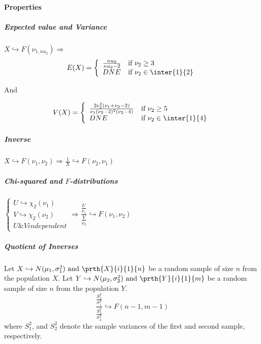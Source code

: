 \paragraph{Properties}
\subparagraph{Expected value and Variance}
$X\hookrightarrow F(\nu_{{1},nu_{2}})\Rightarrow$
$$
E(X) = 
\left\{
\begin{array}{ll}
	\frac{nu_{2}}{nu_{2}-2} & \mbox{if }\nu_{2}\geq 3 \\
	DNE &\mbox{if }\nu_{2}\in\inter{1}{2}
\end{array}
\right.
$$
\begin{center}
	And
\end{center}
$$
V(X) = 
\left\{
\begin{array}{ll}
	\frac{2\nu_{2}^{2}(\nu_{1}+\nu_{2}-2)}{\nu_{1}(\nu_{2}-2)^{2}(\nu_{2}-4)} & \mbox{if }\nu_{2}\geq 5 \\
	DNE &\mbox{if }\nu_{2}\in\inter{1}{4}
\end{array}
\right.
$$
\subparagraph{Inverse}
$X\hookrightarrow F(\nu_{1},\nu_{2})\Rightarrow \frac{1}{X}\hookrightarrow F(\nu_{2},\nu_{1})$\\
\subparagraph{Chi-squared and $F$-distributions}
$
\begin{cases}
	U\hookrightarrow\chi_{2}(\nu_{1})\\
	V\hookrightarrow\chi_{2}(\nu_{2})\\
	U\& V independent
\end{cases}
\Rightarrow
\dfrac{\frac{U}{\nu_{1}}}{\frac{V}{\nu_{2}}}\hookrightarrow F(\nu_{1},\nu_{2})
$
\subparagraph{Quotient of Inverses}
Let $X\hookrightarrow N(\mu_{1},\sigma_{1}^{2})\text{ and }\prth{X}{i}{1}{n}$ be a random sample of size $n$ from the population $X$.
Let $Y\hookrightarrow N(\mu_{2},\sigma_{2}^{2})\text{ and }\prth{Y}{i}{1}{m}$ be a random sample of size $n$ from the population $Y$.
$$
\dfrac{\frac{S_{1}^{2}}{\sigma_{1}^{2}}}{\frac{S_{2}^{2}}{\sigma_{2}^{2}}} \hookrightarrow F(n-1, m-1)
$$
where $S_{1}^{2}$, and $S_{2}^{2}$ denote the sample variances of the
first and second sample, respectively.
